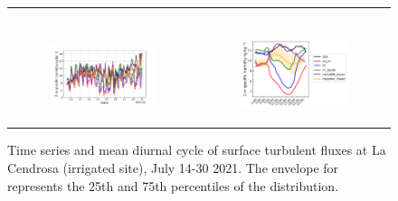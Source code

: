 \begin{figure}[hbtp]
\begin{tabular}{cc}
\begin{subfigure}[t]{0.5\textwidth}
        \end{subfigure} \\
        \begin{subfigure}[t]{0.5\textwidth}
            \caption{}
            \includegraphics[width=\textwidth]{images/chap5/SOP_TS_DC/time_series_cendrosa_q2m.png}
        \end{subfigure} &
        \begin{subfigure}[t]{0.5\textwidth}
            \caption{}
            \includegraphics[width=\textwidth]{images/chap5/SOP_TS_DC/diurnal_cycle_cendrosa_q2m.png}
        \end{subfigure}
    \end{tabular}
    \caption{Time series and mean diurnal cycle of surface turbulent fluxes at La Cendrosa (irrigated site), July 14-30 2021. The envelope for \mesomean represents the 25th and 75th percentiles of the distribution.}
    \label{fig:cendrosa_surfacevars}
\end{figure}


